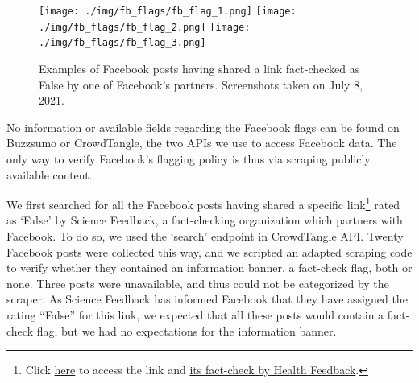 \documentclass{article}
\begin{document}
\begin{figure}[h]
\centering
\texttt{[image: ./img/fb\_flags/fb\_flag\_1.png]}
\texttt{[image: ./img/fb\_flags/fb\_flag\_2.png]}
\texttt{[image: ./img/fb\_flags/fb\_flag\_3.png]}
\caption{Examples of Facebook posts having shared a link fact-checked as False by one of Facebook’s partners. Screenshots taken on July 8, 2021.} 
\label{fb_flags}
\end{figure}
No information or available fields regarding the Facebook flags can be found on Buzzsumo or CrowdTangle, the two APIs we use to access Facebook data. The only way to verify Facebook’s flagging policy is thus via scraping publicly available content. 

We first searched for all the Facebook posts having shared a specific link\footnote{ Click \href{https://beforeitsnews.com/eu/2021/04/stay-away-from-the-vaxxed-it-is-official-from-pfizers-own-documents-2671454.html}{here} to access the link and  \href{https://healthfeedback.org/claimreview/insufficient-evidence-to-claim-covid-19-vaccines-cause-menstrual-irregularities-in-vaccinated-women-vaccinated-people-arent-making-unvaccinated-people-ill/}{its fact-check by Health Feedback}.} rated as ‘False’ by Science Feedback, a fact-checking organization which partners with Facebook. To do so, we used the `search' endpoint in CrowdTangle API.
Twenty Facebook posts were collected this way, and we scripted an adapted scraping code to verify whether they contained an information banner, a fact-check flag, both or none. Three posts were unavailable, and thus could not be categorized by the scraper. As Science Feedback has informed Facebook that they have assigned the rating ``False'' for this link, we expected that all these posts would contain a fact-check flag, but we had no expectations for the information banner. 
\end{document}
